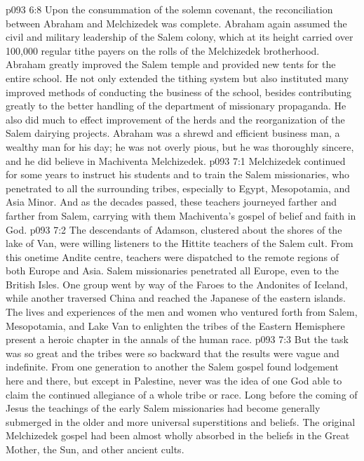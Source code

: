 \vs p093 6:8 Upon the consummation of the solemn covenant, the reconciliation between Abraham and Melchizedek was complete. Abraham again assumed the civil and military leadership of the Salem colony, which at its height carried over 100,000 regular tithe payers on the rolls of the Melchizedek brotherhood. Abraham greatly improved the Salem temple and provided new tents for the entire school. He not only extended the tithing system but also instituted many improved methods of conducting the business of the school, besides contributing greatly to the better handling of the department of missionary propaganda. He also did much to effect improvement of the herds and the reorganization of the Salem dairying projects. Abraham was a shrewd and efficient business man, a wealthy man for his day; he was not overly pious, but he was thoroughly sincere, and he did believe in Machiventa Melchizedek.
\vs p093 7:1 Melchizedek continued for some years to instruct his students and to train the Salem missionaries, who penetrated to all the surrounding tribes, especially to Egypt, Mesopotamia, and Asia Minor. And as the decades passed, these teachers journeyed farther and farther from Salem, carrying with them Machiventa’s gospel of belief and faith in God.
\vs p093 7:2 The descendants of Adamson, clustered about the shores of the lake of Van, were willing listeners to the Hittite teachers of the Salem cult. From this onetime Andite centre, teachers were dispatched to the remote regions of both Europe and Asia. Salem missionaries penetrated all Europe, even to the British Isles. One group went by way of the Faroes to the Andonites of Iceland, while another traversed China and reached the Japanese of the eastern islands. The lives and experiences of the men and women who ventured forth from Salem, Mesopotamia, and Lake Van to enlighten the tribes of the Eastern Hemisphere present a heroic chapter in the annals of the human race.
\vs p093 7:3 But the task was so great and the tribes were so backward that the results were vague and indefinite. From one generation to another the Salem gospel found lodgement here and there, but except in Palestine, never was the idea of one God able to claim the continued allegiance of a whole tribe or race. Long before the coming of Jesus the teachings of the early Salem missionaries had become generally submerged in the older and more universal superstitions and beliefs. The original Melchizedek gospel had been almost wholly absorbed in the beliefs in the Great Mother, the Sun, and other ancient cults.
